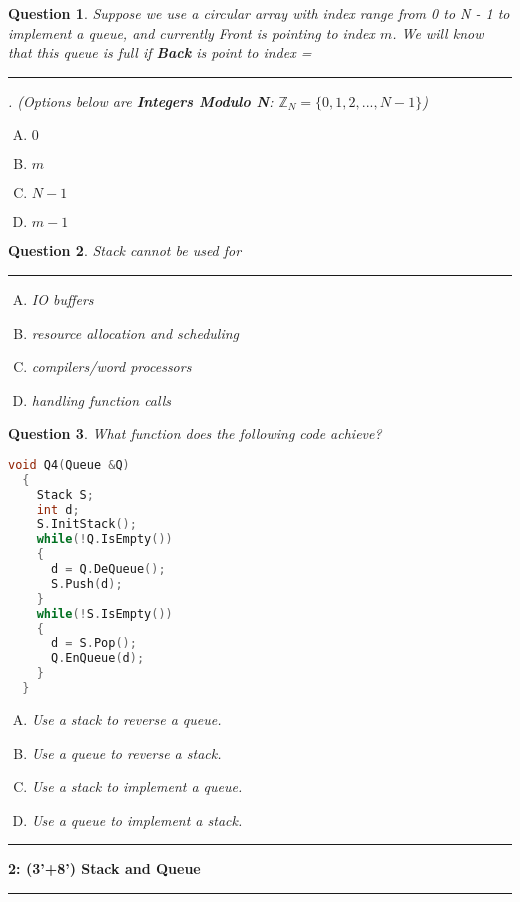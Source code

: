 \documentclass[10.5pt]{article}
\newcommand\question[2]{\vspace{.25in}\hrule\textbf{#1: #2}\vspace{.5em}\hrule\vspace{.10in}}
\newtheorem{Q}{Question}
\begin{document}
\begin{Q}
	Suppose we use a circular array with index range from 0 to N - 1 to implement a queue, and currently Front is pointing to index $m$. We will know that this queue is full if \textbf{Back} is point to index = \rule[-3pt]{1cm}{0.05em}. (Options below are \textbf{Integers Modulo N}: $\mathbb{Z}_N = \{0, 1, 2, ..., N-1\}$)
	\begin{enumerate}[(A)]
		\item $0$
		\item $m$
		\item $N-1$
		\item $m-1$
	\end{enumerate}
\end{Q}

\begin{Q}
	Stack cannot be used for\rule[-3pt]{2cm}{0.05em}
	\begin{enumerate}[(A)]
		\item IO buffers
		\item resource allocation and scheduling
		\item compilers/word processors
		\item handling function calls
	\end{enumerate}
\end{Q}

\begin{Q}
	What function does the following code achieve?
	\rm{
\begin{lstlisting}[language=C++]
  void Q4(Queue &Q) 
  {
    Stack S;
	int d;
	S.InitStack();
	while(!Q.IsEmpty())
	{
	  d = Q.DeQueue();
	  S.Push(d);
	}
	while(!S.IsEmpty())
	{
	  d = S.Pop();
	  Q.EnQueue(d);
	}
  }
\end{lstlisting}
	}
	\begin{enumerate}[(A)]
		\item Use a stack to reverse a queue.
		\item Use a queue to reverse a stack.
		\item Use a stack to implement a queue.
		\item Use a queue to implement a stack.
	\end{enumerate}
\end{Q}

\question{2}{(3'+8') Stack and Queue}
\end{document}
